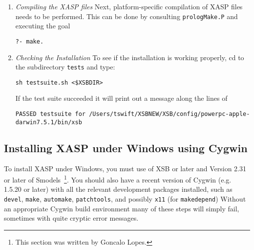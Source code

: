 \begin{enumerate}
\item {\em Compiling the XASP files} Next, platform-specific
  compilation of XASP files needs to be performed.  This can be done
  by consulting {\tt prologMake.P} and executing the goal
\begin{center}
  {\tt ?- make.}
\end{center}
%
\item {\em Checking the Installation} 
%
To see if the installation is working properly, cd to the subdirectory
{\tt tests} and type: 

{\tt sh testsuite.sh <\$XSBDIR>}

If the test suite succeeded it will print out a message along the lines of 

\begin{small}
{\tt PASSED testsuite for /Users/tswift/XSBNEW/XSB/config/powerpc-apple-darwin7.5.1/bin/xsb}
\end{small}

\end{enumerate}

\subsection{Installing XASP under Windows using Cygwin}

To install XASP under Windows, you must use \version{} of XSB or later
and Version 2.31 or later of Smodels~\footnote{This section was
  written by Goncalo Lopes.}.  You should also have a recent version
of Cygwin (e.g. 1.5.20 or later) with all the relevant development
packages installed, such as {\tt devel}, {\tt make}, {\tt automake},
{\tt patchtools}, and possibly {\tt x11} (for {\tt makedepend})
Without an appropriate Cygwin build environment many of these steps
will simply fail, sometimes with quite cryptic error messages.

